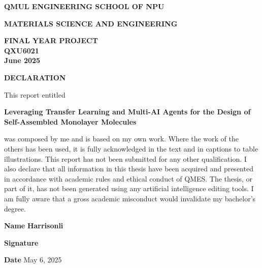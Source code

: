\documentclass[a4paper,12pt]{mythesisclass}
\begin{document}
	\newpage
	\begin{titlepage}
		\begin{center}
			\textbf{QMUL ENGINEERING SCHOOL OF NPU}
			
			\vspace{1.5em}
			
			\textbf{MATERIALS SCIENCE AND ENGINEERING}
			
			\vspace{1.5em}
			
			\textbf{FINAL YEAR PROJECT}\\
			\textbf{QXU6021}\\
			\textbf{June 2025}
			
			\vspace{2em}
			
			\textbf{DECLARATION}
		\end{center}
		
		\vspace{2em}
		
		\noindent This report entitled
		
		\vspace{1em}
		
		\begin{center}
			\textbf{Leveraging Transfer Learning and Multi-AI Agents for the Design of Self-Assembled Monolayer Molecules}
		\end{center}
		
		\vspace{1em}
		
		\noindent was composed by me and is based on my own work. Where the work of the others has been used, it is fully acknowledged in the text and in captions to table illustrations. This report has not been submitted for any other qualification. I also declare that all information in this thesis have been acquired and presented in accordance with academic rules and ethical conduct of QMES. The thesis, or part of it, has not been generated using any artificial intelligence editing tools. I am fully aware that a gross academic misconduct would invalidate my bachelor’s degree.
		
		\vspace{1em}
		
		\noindent \textbf{Name} \hspace{1em} \textbf{Harrisonli}
		\vspace{1cm}
		
		\noindent \textbf{Signature} \hspace{1em}
        \vspace{1cm}
		
		\noindent \textbf{Date}  \hspace{1cm} May 6, 2025
		
	\end{titlepage}
\tableofcontents
\end{document}
